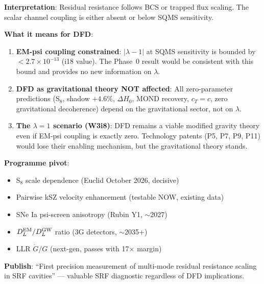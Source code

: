 \documentclass[11pt]{article}
\newcommand{\ee}[1]{\times 10^{#1}}
\newcommand{\lbone}{|\lambda - 1|}
\newcommand{\Rq}{\mathcal{R}}
\begin{document}
\begin{tcolorbox}[colback=red!5!white, colframe=red!60!black,
  title=\textbf{OUTCOME B: BCS CONFIRMED ($\Rq_{\rm meas} > 1.5$
  at $>3\sigma$)}]

\textbf{Interpretation}: Residual resistance follows BCS or trapped
flux scaling. The scalar channel coupling is either absent or below
SQMS sensitivity.

\textbf{What it means for DFD}:
\begin{enumerate}[nosep]
\item \textbf{EM-psi coupling constrained}: $\lbone$ at SQMS
  sensitivity is bounded by $< 2.7\ee{-13}$ (i18 value). The Phase~0
  result would be consistent with this bound and provides no new
  information on $\lambda$.
\item \textbf{DFD as gravitational theory NOT affected}: All
  zero-parameter predictions (S$_8$, shadow $+4.6\%$, $\Delta H_0$,
  MOND recovery, $c_T = c$, zero gravitational decoherence) depend
  on the gravitational sector, not on $\lambda$.
\item \textbf{The $\lambda = 1$ scenario (W3i8)}: DFD remains a
  viable modified gravity theory even if EM-psi coupling is exactly
  zero. Technology patents (P5, P7, P9, P11) would lose their
  enabling mechanism, but the gravitational theory stands.
\end{enumerate}

\textbf{Programme pivot}:
\begin{itemize}[nosep]
\item S$_8$ scale dependence (Euclid October 2026, decisive)
\item Pairwise kSZ velocity enhancement (testable NOW, existing data)
\item SNe Ia psi-screen anisotropy (Rubin Y1, $\sim$2027)
\item $D_L^{\rm EM}/D_L^{\rm GW}$ ratio (3G detectors, $\sim$2035+)
\item LLR $\dot{G}/G$ (next-gen, passes with 17$\times$ margin)
\end{itemize}

\textbf{Publish}: ``First precision measurement of multi-mode residual
resistance scaling in SRF cavities'' --- valuable SRF diagnostic
regardless of DFD implications.
\end{tcolorbox}
\end{document}
